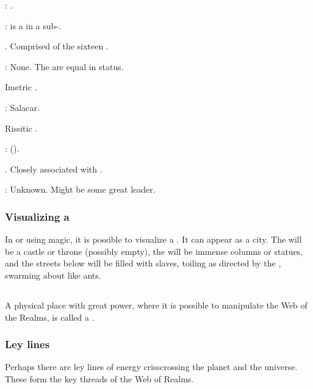 \begin{gloss}
    \Apex:
    \Azraid. 
    
    \CardinalPoints: 
    \Teshrial{} is a \cardinalpoint{} in a sub-\matrix.
  
  
  
    \Iquinian{} \matrix.
    Comprised of the sixteen \sephiroth. 
    
    \Apex: 
    None. The \sephiroth{} are equal in status. 
  
    Imetric \matrix. 
    
    \Apex: 
    Salacar. 
  
    Rissitic \matrix. 
    
    \Apex: 
    \HriistN{} (\Secherdamon). 
  
    \Vorcanth{} \matrix.
    Closely associated with . 
    
    \Apex: 
    Unknown. 
    Might be some great \vorcanth{} leader. 
\end{gloss}





\subsubsection{Visualizing a \matrixx}
In  or using magic, it is possible to visualize a \matrixx{}. It can appear as a city. The \apex{} will be a castle or throne (possibly empty), the \vertices{} will be immense columns or statues, and the streets below will be filled with slaves, toiling as directed by the \vertices, swarming about like ants. 










\subsection{\Nexus}
\index{\nexus}
A physical place with great power, where it is possible to manipulate the Web of the Realms, is called a \nexus. 





\subsubsection{Ley lines}
Perhaps there are ley lines of \nexus{} energy crisscrossing the planet and the universe. These form the key threads of the Web of Realms. 

